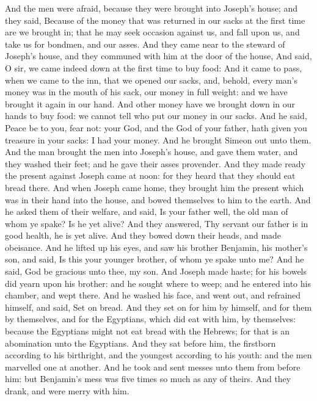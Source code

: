 \begin{biblechapter}
\verse And the men were afraid, because they were brought into Joseph's house; and they said, Because of the money that was returned in our sacks at the first time are we brought in; that he may seek occasion against us, and fall upon us, and take us for bondmen, and our asses.
\verse And they came near to the steward of Joseph's house, and they communed with him at the door of the house,
\verse And said, O sir, we came indeed down at the first time to buy food:
\verse And it came to pass, when we came to the inn, that we opened our sacks, and, behold, every man's money was in the mouth of his sack, our money in full weight: and we have brought it again in our hand.
\verse And other money have we brought down in our hands to buy food: we cannot tell who put our money in our sacks.
\verse And he said, Peace be to you, fear not: your God, and the God of your father, hath given you treasure in your sacks: I had your money. And he brought Simeon out unto them.
\verse And the man brought the men into Joseph's house, and gave them water, and they washed their feet; and he gave their asses provender.
\verse And they made ready the present against Joseph came at noon: for they heard that they should eat bread there.
\verse And when Joseph came home, they brought him the present which was in their hand into the house, and bowed themselves to him to the earth.
\verse And he asked them of their welfare, and said, Is your father well, the old man of whom ye spake? Is he yet alive?
\verse And they answered, Thy servant our father is in good health, he is yet alive. And they bowed down their heads, and made obeisance.
\verse And he lifted up his eyes, and saw his brother Benjamin, his mother's son, and said, Is this your younger brother, of whom ye spake unto me? And he said, God be gracious unto thee, my son.
\verse And Joseph made haste; for his bowels did yearn upon his brother: and he sought where to weep; and he entered into his chamber, and wept there.
\verse And he washed his face, and went out, and refrained himself, and said, Set on bread.
\verse And they set on for him by himself, and for them by themselves, and for the Egyptians, which did eat with him, by themselves: because the Egyptians might not eat bread with the Hebrews; for that is an abomination unto the Egyptians.
\verse And they sat before him, the firstborn according to his birthright, and the youngest according to his youth: and the men marvelled one at another.
\verse And he took and sent messes unto them from before him: but Benjamin's mess was five times so much as any of theirs. And they drank, and were merry with him.
\end{biblechapter}

